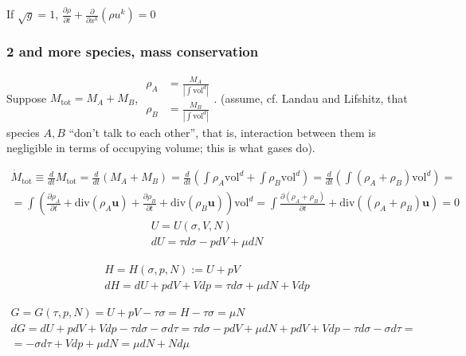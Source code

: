 \documentclass[10pt]{amsart}
\begin{document}
\begin{multicols*}{2}
If $\sqrt{g}=1$, $\frac{ \partial \rho}{ \partial t} + \frac{ \partial }{ \partial x^k}(\rho u^k) = 0 $

\subsubsection{2 and more species, mass conservation}

Suppose $M_{\text{tot}} = M_A + M_B$, $\begin{aligned} \rho_{A} & = \frac{ M_A}{ | \int \text{vol}^d| } \\ \rho_{B} & = \frac{ M_B}{ | \int \text{vol}^d| } \end{aligned}$.  (assume, cf. Landau and Lifshitz, that species $A,B$ ``don't talk to each other'', that is, interaction between them is negligible in terms of occupying volume; this is what gases do).

\[
\begin{gathered}
  \dot{M}_{\text{tot}} \equiv \frac{d}{dt} M_{\text{tot}} = \frac{d}{dt}(M_A + M_B) = \frac{d}{dt} \left( \int \rho_A \text{vol}^d + \int \rho_B \text{vol}^d\right) = \frac{d}{dt} \left( \int (\rho_A + \rho_B) \text{vol}^d\right) = \\
  = \int \left( \frac{ \partial \rho_A}{ \partial t} + \text{div}(\rho_A \mathbf{u}) + \frac{ \partial \rho_B}{\partial t} + \text{div}(\rho_B \mathbf{u}) \right) \text{vol}^d   = \int \frac{ \partial (\rho_A + \rho_B) }{ \partial t} + \text{div}((\rho_A + \rho_B)\mathbf{u} ) = 0 
  \end{gathered}
\]
\begin{equation}
  \begin{gathered}
    U = U(\sigma, V,N) \\ 
    dU  = \tau d\sigma - p dV + \mu dN
    \end{gathered}
  \end{equation}


\begin{equation}
\begin{gathered}
  H=H(\sigma,p,N) := U + pV \\
dH = dU + pdV + Vdp = \tau d\sigma + \mu dN + Vdp
\end{gathered}
\end{equation}

\begin{equation}
\begin{gathered}
  G = G(\tau, p , N) = U + pV - \tau \sigma = H-\tau \sigma = \mu N \\ 
  dG = dU + pdV + Vdp - \tau d\sigma - \sigma d\tau = \tau d\sigma - pdV + \mu dN + pdV + Vdp - \tau d\sigma - \sigma d\tau = \\
  = -\sigma d\tau + Vdp + \mu dN = \mu dN + N d\mu
  \end{gathered}
  \end{equation}


\end{multicols*}
\end{document}
